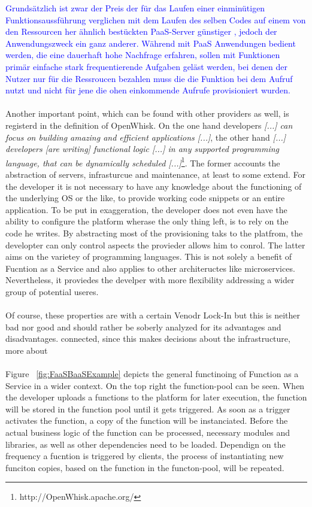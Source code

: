 \documentclass[11pt]{article}
\begin{document}
\textcolor{blue}{Grundsätzlich ist zwar der Preis der für das Laufen einer einminütigen Funktionsaussführung verglichen mit dem Laufen des selben Codes auf einem von den Ressourcen her ähnlich bestückten PaaS-Server günstiger \cite{jonas2019cloud}, jedoch der Anwendungszweck ein ganz anderer. Während mit PaaS Anwendungen bedient werden, die eine dauerhaft hohe Nachfrage erfahren, sollen mit Funktionen primär einfache stark frequentierende Aufgaben geläst werden, bei denen der Nutzer nur für die Ressroucen bezahlen muss die die Funktion bei dem Aufruf nutzt und nicht für jene die ohen einkommende Aufrufe provisioniert wurden.}\\\\
Another important point, which can be found with other providers as well, is registerd in the definition of OpenWhisk. On the one hand developers \glqq \textit{[...] can focus on building amazing and efficient applications [...]}\grqq{}, the other hand \glqq \textit{[...] developers [are writing] functional logic [...] in any supported programming language, that can be dynamically scheduled [...]}\grqq{}\footnote{http://OpenWhisk.apache.org/}. The former accounts the abstraction of servers, infrasturcue and maintenance, at least to some extend. For the developer it is not necessary to have any knowledge about the functioning of the underlying OS or the like, to provide working code snippets or an entire application. To be put in exaggeration, the developer does not even have the ability to configure the platform wherase the only thing left, is to rely on the code he writes. By abstracting most of the provisioning taks to the platfrom, the developter can only control aspects the provieder allows him to conrol. The latter aims on the varietey of programming languages. This is not solely a benefit of Fucntion as a Service and also applies to other architeructes like microservices. Nevertheless, it proviedes the develper with more flexibility addressing a wider group of potential useres.\\\\
Of course, these properties are with a certain Venodr Lock-In but this is neither bad nor good and should rather be soberly analyzed for its advantages and disadvantages. connected, since this makes decisions about the infrastructure, more about\\\\
Figure ~\ref{fig:FaaSBaaSExample} depicts the general functinoing of Function as a Service in a wider context. On the top right the function-pool can be seen. When the developer uploads a functions to the platform for later execution, the function will be stored in the function pool until it gets triggered. As soon as a trigger activates the function, a copy of the function will be instanciated. Before the actual business logic of the function can be processed, necessary modules and libraries, as well as other dependencies need to be loaded. Dependign on the frequency a fucntion is triggered by clients, the process of instantiating new funciton copies, based on the function in the functon-pool, will be repeated.    
\end{document}
